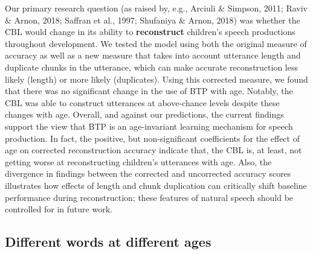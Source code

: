 \documentclass[
  english,
  man,mask,floatsintext]{apa6}
\begin{document}
Our primary research question (as raised by, e.g., Arciuli \& Simpson, 2011; Raviv \& Arnon, 2018; Saffran et al., 1997; Shufaniya \& Arnon, 2018) was whether the CBL would change in its ability to \textbf{reconstruct} children's speech productions throughout development. We tested the model using both the original measure of accuracy as well as a new measure that takes into account utterance length and duplicate chunks in the utterance, which can make accurate reconstruction less likely (length) or more likely (duplicates). Using this corrected measure, we found that there was no significant change in the use of BTP with age. Notably, the CBL was able to construct utterances at above-chance levels despite these changes with age. Overall, and against our predictions, the current findings support the view that BTP is an age-invariant learning mechanism for speech production. In fact, the positive, but non-significant coefficients for the effect of age on corrected reconstruction accuracy indicate that, the CBL is, at least, not getting worse at reconstructing children's utterances with age. Also, the divergence in findings between the corrected and uncorrected accuracy scores illustrates how effects of length and chunk duplication can critically shift baseline performance during reconstruction; these features of natural speech should be controlled for in future work.

\hypertarget{different-words-at-different-ages}{%
\subsection{Different words at different ages}\label{different-words-at-different-ages}}
\end{document}
